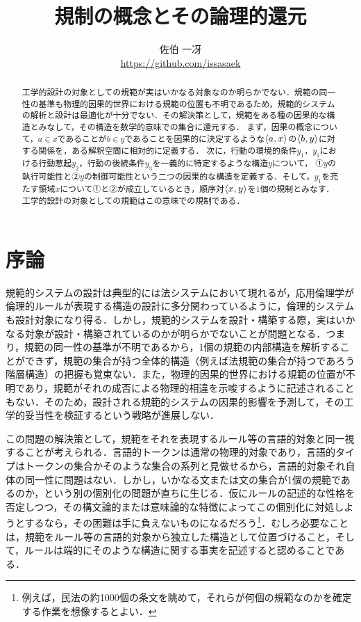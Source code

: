 
\title{規制の概念とその論理的還元}
\author{佐伯 一冴\\\small\url{https://github.com/issasaek}}
\date{}
\maketitle

\begin{abstract}
工学的設計の対象としての規範が実はいかなる対象なのか明らかでない．規範の同一性の基準も物理的因果的世界における規範の位置も不明であるため，規範的システムの解析と設計は最適化が十分でない．その解決策として，規範をある種の因果的な構造とみなして，その構造を数学的意味での集合に還元する．
まず，因果の概念について，$a\in x$であることが$b\in y$であることを因果的に決定するような$\langle a,x \rangle$の$\langle b,y \rangle$に対する関係を，ある解釈空間に相対的に定義する．
次に，行動の環境的条件$y_1$，$y_1$における行動惹起$y_2$，行動の後続条件$y_3$を一義的に特定するような構造$y$について，
①$y$の執行可能性と②$y$の制御可能性という二つの因果的な構造を定義する．そして，$y_1$を充たす領域$x$について①と②が成立しているとき，順序対$\langle x,y \rangle$を1個の規制とみなす．工学的設計の対象としての規範はこの意味での規制である．
\end{abstract}

\section{序論}

規範的システムの設計は典型的には法システムにおいて現れるが，応用倫理学が倫理的ルールが表現する構造の設計に多分関わっているように，倫理的システムも設計対象になり得る．しかし，規範的システムを設計・構築する際，実はいかなる対象が設計・構築されているのかが明らかでないことが問題となる．つまり，規範の同一性の基準が不明であるから，1個の規範の内部構造を解析することができず，規範の集合が持つ全体的構造（例えば法規範の集合が持つであろう階層構造）の把握も覚束ない．また，物理的因果的世界における規範の位置が不明であり，規範がそれの成否による物理的相違を示唆するように記述されることもない．そのため，設計される規範的システムの因果的影響を予測して，その工学的妥当性を検証するという戦略が進展しない．

この問題の解決策として，規範をそれを表現するルール等の言語的対象と同一視することが考えられる．言語的トークンは通常の物理的対象であり，言語的タイプはトークンの集合かそのような集合の系列と見做せるから，言語的対象それ自体の同一性に問題はない．しかし，いかなる文または文の集合が1個の規範であるのか，という別の個別化の問題が直ちに生じる．仮にルールの記述的な性格を否定しつつ，その構文論的または意味論的な特徴によってこの個別化に対処しようとするなら，その困難は手に負えないものになるだろう\footnote{例えば，民法の約1000個の条文を眺めて，それらが何個の規範なのかを確定する作業を想像するとよい．}．むしろ必要なことは，規範をルール等の言語的対象から独立した構造として位置づけること，そして，ルールは端的にそのような構造に関する事実を記述すると認めることである．

